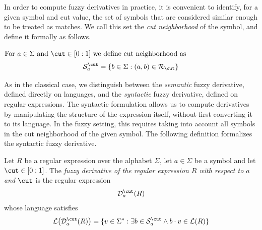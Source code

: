 \noindent
In order to compute fuzzy derivatives in practice, it is convenient to identify, for a given symbol and cut value, the set of symbols that are considered similar enough to be treated as matches. We call this set the \emph{cut neighborhood} of the symbol, and define it formally as follows.


\begin{definition}\label{def:cut-neighborhood}
    $\text{For } a\in\Sigma \text{ and } \cut\in[0:1] \text{ we define cut neighborhood as}$
    $$
        \mathcal{S}^\cut_a = \{b \in\Sigma :  (a,b)\in\mathcal{R}_\cut\}
    $$
\end{definition}

\noindent
As in the classical case, we distinguish between the \emph{semantic} fuzzy derivative, defined directly on languages, and the \emph{syntactic} fuzzy derivative, defined on regular expressions. The syntactic formulation allows us to compute derivatives by manipulating the structure of the expression itself, without first converting it to its 
language. In the fuzzy setting, this requires taking into account all symbols in the cut neighborhood of the given symbol. The following definition formalizes the syntactic fuzzy derivative.


\begin{definition}\label{def:regex-fuzzy-derivative}
    Let $R$ be a regular expression over the alphabet $\Sigma$, let
    $a \in \Sigma$ be a symbol and let $\cut\in[0:1]$.
    The \emph{fuzzy derivative of the regular expression $R$ with respect to $a$ and $\cut$}
    is the regular expression
    $$
        \mathcal{D}^\cut_{a}(R)
    $$
    whose language satisfies
    $$
        \mathcal{L}\bigl(\mathcal{D}^\cut_a(R)\bigr) = \{v \in \Sigma^* : \exists b\in 
            \mathcal{S}^\cut_a \land b\cdot v \in \mathcal{L}(R)
        \}
    $$
\end{definition}

